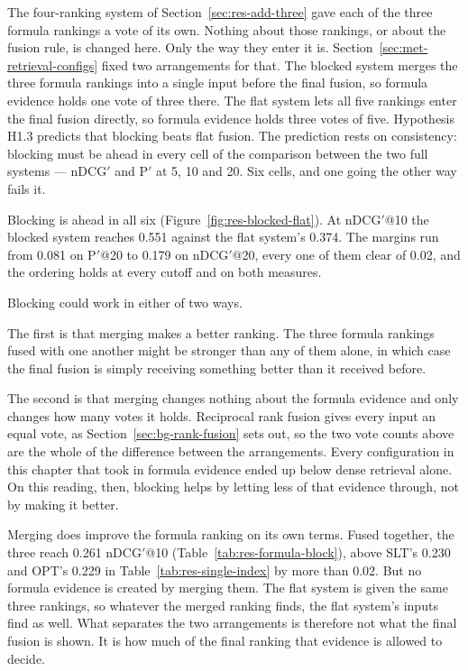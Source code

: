 The four-ranking system of Section~\ref{sec:res-add-three} gave each of the three formula
rankings a vote of its own. Nothing about those rankings, or about the fusion rule, is changed
here. Only the way they enter it is. Section~\ref{sec:met-retrieval-configs} fixed two arrangements
for that. The blocked system merges the three formula rankings into a single input before the
final fusion, so formula evidence holds one vote of three there. The flat system lets all five
rankings enter the final fusion directly, so formula evidence holds three votes of five.
Hypothesis H1.3 predicts that blocking beats flat fusion. The prediction rests on consistency:
blocking must be ahead in every cell of the comparison between the two full systems --- nDCG$'$
and P$'$ at 5, 10 and 20. Six cells, and one going the other way fails it.

Blocking is ahead in all six (Figure~\ref{fig:res-blocked-flat}). At nDCG$'$@10 the blocked
system reaches 0.551 against the flat system's 0.374. The margins run from 0.081 on P$'$@20 to
0.179 on nDCG$'$@20, every one of them clear of 0.02, and the ordering holds at every cutoff and
on both measures.

Blocking could work in either of two ways.

The first is that merging makes a better ranking. The three formula rankings fused with one
another might be stronger than any of them alone, in which case the final fusion is simply
receiving something better than it received before.

The second is that merging changes nothing about the formula evidence and only changes how many
votes it holds. Reciprocal rank fusion gives every input an equal vote, as
Section~\ref{sec:bg-rank-fusion} sets out, so the two vote counts above are the whole of the
difference between the arrangements. Every configuration in this chapter that took in formula evidence ended up below dense retrieval
alone. On this reading, then, blocking helps by letting less of that evidence through, not by
making it better.

Merging does improve the formula ranking on its own terms. Fused together, the three reach 0.261
nDCG$'$@10 (Table~\ref{tab:res-formula-block}), above SLT's 0.230 and OPT's 0.229 in
Table~\ref{tab:res-single-index} by more than 0.02. But no formula evidence is created by merging them. The flat system is given the
same three rankings, so whatever the merged ranking finds, the flat system's inputs find as
well. What separates the two arrangements is therefore not what the final fusion is shown. It is
how much of the final ranking that evidence is allowed to decide.

